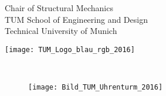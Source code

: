 \thispagestyle{empty}
\newlength{\headsepold}
\setlength{\headsepold}{\headsep}
\setlength{\headsep}{-1.26cm}
\begin{center}
{\sffamily
\fontsize{18}{18}\selectfont 
\begin{minipage}[b]{120mm}
{
\small \textcolor{tum_blau_2016}{Chair of Structural Mechanics \\
TUM School of Engineering and Design \\
Technical University of Munich}
}
\end{minipage}
 \hfill \texttt{[image: TUM\_Logo\_blau\_rgb\_2016]}
\vspace{0.5cm}

}
\end{center}
\vspace{3cm}
{\sffamily
\begin{doublespace} %
{\huge{\textbf{\veranstaltung}}}%
\end{doublespace}
\Large \lehrer 
\ifdef{\assistent}{\\[.1cm] \normalsize \assistent}{}
\\[.9cm]
\large \semester %
}

\enlargethispage{3.5cm}
\vspace{2cm}
\begin{figure}[h]
\begin{addmargin}{-1.28cm}
\flushright
\texttt{[image: Bild\_TUM\_Uhrenturm\_2016]}%
\end{addmargin}
\end{figure}
\vfill
\restoregeometry
\newpage
\setlength{\headsep}{\headsepold}
